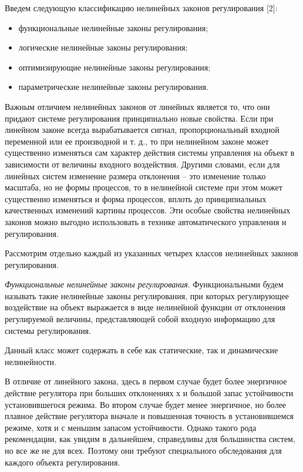 Введем следующую классификацию нелинейных законов регулирования [2]:

\begin{itemize}
  \item функциональные нелинейные законы регулирования;
  \item логические нелинейные законы регулирования;
  \item оптимизирующие нелинейные законы регулирования;
  \item параметрические нелинейные законы регулирования.
\end{itemize}

Важным отличием нелинейных законов от линейных является то, что они придают системе регулирования принципиально новые свойства. Если при линейном законе всегда вырабатывается сигнал, пропорциональный входной переменной или ее производной и т. д., то при нелинейном законе может существенно изменяться сам характер действия системы управления на объект в зависимости от величины входного воздействия. Другими словами, если для линейных систем изменение размера отклонения – это изменение только масштаба, но не формы процессов, то в нелинейной системе при этом может существенно изменяться и форма процессов, вплоть до принципиальных качественных изменений картины процессов. Эти особые свойства нелинейных законов можно выгодно использовать в технике автоматического управления и регулирования.

Рассмотрим отдельно каждый из указанных четырех классов нелинейных законов регулирования.

\textit{Функциональные нелинейные законы регулирования}. Функциональными будем называть такие нелинейные законы регулирования, при которых регулирующее воздействие на объект выражается в виде нелинейной функции от отклонения регулируемой величины, представляющей собой входную информацию для системы регулирования.

Данный класс может содержать в себе как статические, так и динамические нелинейности. 

В отличие от линейного закона, здесь в первом случае будет более энергичное действие регулятора при больших отклонениях х и большой запас устойчивости установившегося режима. Во втором случае будет менее энергичное, но более плавное действие регулятора вначале и повышенная точность в установившемся режиме, хотя и с меньшим запасом устойчивости. Однако такого рода рекомендации, как увидим в дальнейшем, справедливы для большинства систем, но все же не для всех. Поэтому они требуют специального обследования для каждого объекта регулирования.

